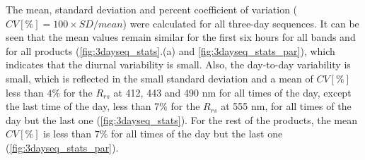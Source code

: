 \documentclass[onecolumn,3p,letterpaper,11pt]{elsarticle}
\begin{document}
The mean, standard deviation and percent coefficient of variation ($CV[\%]=100\times SD/mean$) were calculated for all three-day sequences. It can be seen that the mean values remain similar for the first six hours for all bands and for all products (\autoref{fig:3dayseq_stats}.(a) and \autoref{fig:3dayseq_stats_par}), which indicates that the diurnal variability is small. Also, the day-to-day variability is small, which is reflected in the small standard deviation and a mean of $CV[\%]$ less than $4\%$ for the $R_{rs}$ at 412, 443 and 490 nm for all times of the day, except the last time of the day, less than $7\%$ for the $R_{rs}$ at 555 nm, for all times of the day but the last one (\autoref{fig:3dayseq_stats}). For the rest of the products, the mean $CV[\%]$ is less than $7\%$ for all times of the day but the last one (\autoref{fig:3dayseq_stats_par}).
\end{document}
